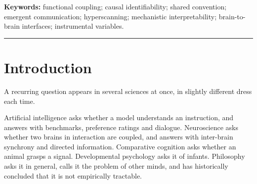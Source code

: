 \documentclass[11pt,a4paper]{article}
\theoremstyle{plain}
\theoremstyle{definition}
\theoremstyle{remark}
\begin{document}
\begin{abstract}
We then characterise what does suffice. Functional coupling is identified by adjustment
when the shared convention is observed, by instrumental variation --- for which, we note,
ordinary channel noise qualifies, inverting the usual impulse to denoise --- or by direct
intervention. Two things notably do not suffice: temporal precedence, so that transfer
entropy and Granger causality inherit the full force of the negative result despite being
called directional; and observation of the receiver's internal state, which fails the
front-door criterion for structural reasons that no gain in recording resolution or
interpretability precision can repair. We conclude that functional coupling is an
\emph{interventional} quantity sitting one rung above where it is currently measured, and
that this, rather than any deep obscurity in the phenomenon, is why debates about machine
understanding do not resolve. We derive consequences for AI evaluation, mechanistic
interpretability and hyperscanning, note that the framework retrodicts the decade-long
stagnation of brain-to-brain interface bandwidth, and close with the open questions that
would decide the account.
\end{abstract}

\vspace{2pt}
\noindent\textbf{Keywords:} functional coupling; causal identifiability; shared convention;
emergent communication; hyperscanning; mechanistic interpretability; brain-to-brain
interfaces; instrumental variables.

\vspace{4pt}
\noindent\rule{\textwidth}{0.4pt}

\section{Introduction}\label{sec:intro}

A recurring question appears in several sciences at once, in slightly different dress each
time.

Artificial intelligence asks whether a model understands an instruction, and answers with
benchmarks, preference ratings and dialogue. Neuroscience asks whether two brains in
interaction are coupled, and answers with inter-brain synchrony and directed information.
Comparative cognition asks whether an animal grasps a signal. Developmental psychology asks
it of infants. Philosophy asks it in general, calls it the problem of other minds, and has
historically concluded that it is not empirically tractable.
\end{document}
